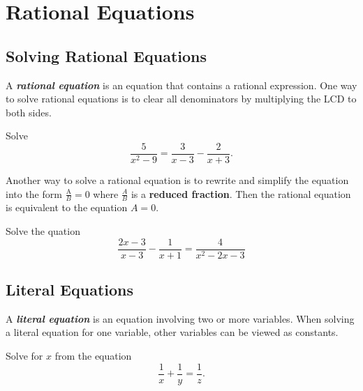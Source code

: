 
\hypertarget{rational-equations}{%
\section{Rational Equations}\label{rational-equations}}

\hypertarget{solving-rational-equations}{%
\subsection{Solving Rational
Equations}\label{solving-rational-equations}}

A \textbf{\emph{rational equation}} is an equation that contains a
rational expression. One way to solve rational equations is to clear all
denominators by multiplying the LCD to both sides.

\begin{example}

Solve \[
\frac{5}{x^2-9}=\frac{3}{x-3}-\frac{2}{x+3}.
\]

\end{example}
\vspace*{5\baselineskip}

Another way to solve a rational equation is to rewrite and simplify the equation into the form \(\frac{\text{A}}{B}=0\) where \(\frac{A}{B}\) is a \textbf{reduced fraction}. Then the rational equation is equivalent to the equation \(A=0\).

\begin{example}
  Solve the quation
  \[\frac{2x-3}{x - 3}-\frac{1}{x+1}=\frac{4}{x^2-2x-3}\]
\end{example}
\vspace*{5\baselineskip}

\hypertarget{literal-equations}{%
\subsection{Literal Equations}\label{literal-equations}}

A \textbf{\emph{literal equation}} is an equation involving two or more
variables. When solving a literal equation for one variable, other
variables can be viewed as constants.

\begin{example}

Solve for \(x\) from the equation \[
\frac{1}{x}+\frac{1}{y}=\frac{1}{z}.  
\]

\end{example}
\vspace*{5\baselineskip}


